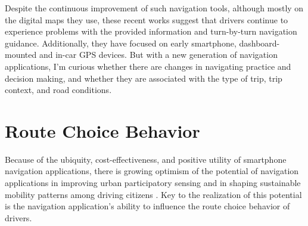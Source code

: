 Despite the continuous improvement of such navigation tools, although mostly on the digital maps they use, these recent works suggest that drivers continue to experience problems with the provided information and turn-by-turn navigation guidance. Additionally, they have focused on early smartphone, dashboard-mounted and in-car GPS devices. But with a new generation of navigation applications, I’m curious whether there are changes in navigating practice and decision making, and whether they are associated with the type of trip, trip context, and road conditions.

\section{Route Choice Behavior}
Because of the ubiquity, cost-effectiveness, and positive utility of smartphone navigation applications, there is growing optimism of the potential of navigation applications in improving urban participatory sensing \cite{Silva2013TrafficAlerts,Xie2015AnNetworks,Silva2016UsersOpportunities} and in shaping sustainable mobility patterns among driving citizens \cite{Ben-Elia2015ResponseReview,Attard2016TheSystems}. Key to the realization of this potential is the navigation application's ability to influence the route choice behavior of drivers. 


